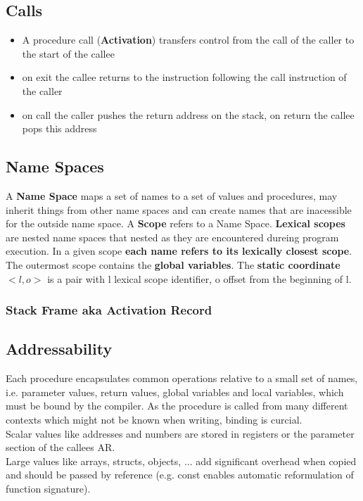 \subsection{Calls}
\begin{itemize}
    \item A procedure call (\textbf{Activation}) transfers control from the call of the caller to the start of the callee
    \item on exit the callee returns to the instruction following the call instruction of the caller
    \item on call the caller pushes the return address on the stack, on return the callee pops this address
\end{itemize}

\subsection{Name Spaces}
A \textbf{Name Space} maps a set of names to a set of values and procedures, may inherit things from other name spaces and can create names that are inacessible for the outside name space. A \textbf{Scope} refers to a Name Space. \textbf{Lexical scopes} are nested name spaces that nested as they are encountered dureing program execution. In a given scope \textbf{each name refers to its lexically closest scope}. The outermost scope contains the \textbf{global variables}. The \textbf{static coordinate $<l,o>$} is a pair with l lexical scope identifier, o offset from the beginning of l.
\subsubsection{Stack Frame aka Activation Record}

\subsection{Addressability}
Each procedure encapsulates common operations relative to a small set of names, i.e. parameter values, return values, global variables and local variables, which must be bound by the compiler. As the procedure is called from many different contexts which might not be known when writing, binding is curcial. \\ 
Scalar values like addresses and numbers are stored in registers or the parameter section of the callees AR. \\
Large values like arrays, structs, objects, $\dots$ add significant overhead when copied and should be passed by reference (e.g. const enables automatic reformulation of function signature). \\


